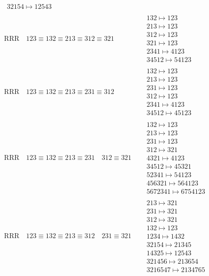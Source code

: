 \documentclass{article}
\begin{document}
\begin{align}
\begin{matrix}
32154 \mapsto 12543
\end{matrix}
\\
\text{RRR}
\quad
123\equiv132\equiv213\equiv312\equiv321
\quad
&
\begin{matrix}
132 \mapsto 123
\\
213 \mapsto 123
\\
312 \mapsto 123
\\
321 \mapsto 123
\\
2341 \mapsto 4123
\\
34512 \mapsto 54123
\end{matrix}
\\
\text{RRR}
\quad
123\equiv132\equiv213\equiv231\equiv312
\quad
&
\begin{matrix}
132 \mapsto 123
\\
213 \mapsto 123
\\
231 \mapsto 123
\\
312 \mapsto 123
\\
2341 \mapsto 4123
\\
34512 \mapsto 45123
\end{matrix}
\\
\text{RRR}
\quad
123\equiv132\equiv213\equiv231
\quad
312\equiv321
\quad
&
\begin{matrix}
132 \mapsto 123
\\
213 \mapsto 123
\\
231 \mapsto 123
\\
312 \mapsto 321
\\
4321 \mapsto 4123
\\
34512 \mapsto 45321
\\
52341 \mapsto 54123
\\
456321 \mapsto 564123
\\
5672341 \mapsto 6754123
\end{matrix}
\\
\text{RRR}
\quad
123\equiv132\equiv213\equiv312
\quad
231\equiv321
\quad
&
\begin{matrix}
213 \mapsto 321
\\
231 \mapsto 321
\\
312 \mapsto 321
\\
132 \mapsto 123
\\
1234 \mapsto 1432
\\
32154 \mapsto 21345
\\
14325 \mapsto 12543
\\
321456 \mapsto 213654
\\
3216547 \mapsto 2134765
\end{matrix}

\end{align}
\end{document}
